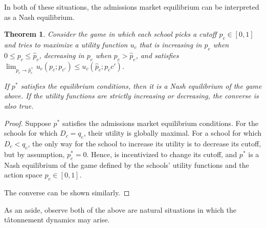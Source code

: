 \documentclass[12pt]{article}
\newtheorem{theorem}{Theorem}
\theoremstyle{definition}
\begin{document}
In both of these situations, the admissions market equilibrium can be interpreted as a Nash equilibrium. 
\begin{theorem}
Consider the game in which each school picks a cutoff $p_c \in [0,1]$ and tries to maximize a utility function $u_c$ that is increasing in $p_c$ when $0 \leq p_c \leq \hat p_c$, decreasing in $p_c$ when $p_c > \hat p_c$, and satisfies $\lim_{p_c \to \hat p_c^+} u_c(p_c; p_{c'}) \leq  u_c(\hat p_c; p_c{c'})$.

If $p^*$ satisfies the equilibrium conditions, then it is a Nash equilibrium of the game above. If the utility functions are strictly increasing or decreasing, the converse is also true.
\end{theorem}
\begin{proof} Suppose $p^*$ satisfies the admissions market equilibrium conditions. For the schools for which $D_c = q_c$, their utility is globally maximal. For a school for which $D_c < q_c$, the only way for the school to increase its utility is to decrease its cutoff, but by assumption, $p_c^* = 0$. Hence, is incentivized to change its cutoff, and $p^*$ is a Nash equilibrium of the game defined by the schools' utility functions and the action space $p_c \in [0, 1]$.

The converse can be shown similarly.\end{proof}

As an aside, observe both of the above are natural situations in which the t\^{atonnement} dynamics may arise.
\end{document}
